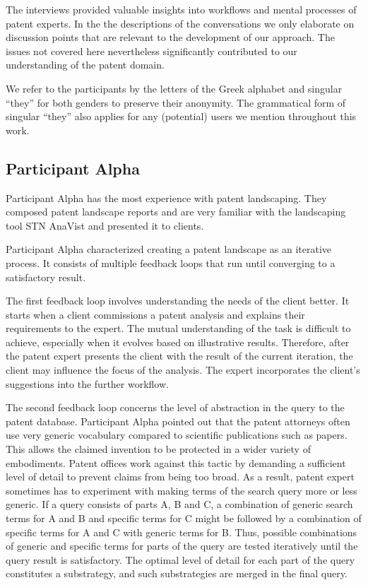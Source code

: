 The interviews provided valuable insights into workflows and mental processes of patent experts. 
In the the descriptions of the conversations we only elaborate on discussion points that are relevant to the development of our approach. 
The issues not covered here nevertheless significantly contributed to our understanding of the patent domain.

We refer to the participants by the letters of the Greek alphabet and singular ``they'' for both genders to preserve their anonymity.
The grammatical form of singular ``they'' also applies for any (potential) users we mention throughout this work.

\subsection{Participant Alpha}
\label{subsec:participant_alpha}

Participant Alpha has the most experience with patent landscaping.
They composed patent landscape reports and are very familiar with the landscaping tool STN AnaVist and presented it to clients.

Participant Alpha characterized creating a patent landscape as an iterative process. 
It consists of multiple feedback loops that run until converging to a satisfactory result.
 
The first feedback loop involves understanding the needs of the client better. 
It starts when a client commissions a patent analysis and explains their requirements to the expert.
The mutual understanding of the task is difficult to achieve, especially when it evolves based on illustrative results. 
Therefore, after the patent expert presents the client with the result of the current iteration, the client may influence the focus of the analysis.
The expert incorporates the client's suggestions into the further workflow.

The second feedback loop concerns the level of abstraction in the query to the patent database.
Participant Alpha pointed out that the patent attorneys often use very generic vocabulary compared to scientific publications such as papers.
This allows the claimed invention to be protected in a wider variety of embodiments.
Patent offices work against this tactic by demanding a sufficient level of detail to prevent claims from being too broad.
As a result, patent expert sometimes has to experiment with making terms of the search query more or less generic.
If a query consists of parts A, B and C, a combination of generic search terms for A and B and specific terms for C might be followed by a combination of specific terms for A and C with generic terms for B.
Thus, possible combinations of generic and specific terms for parts of the query are tested iteratively until the query result is satisfactory.
The optimal level of detail for each part of the query constitutes a substrategy, and such substrategies are merged in the final query.

